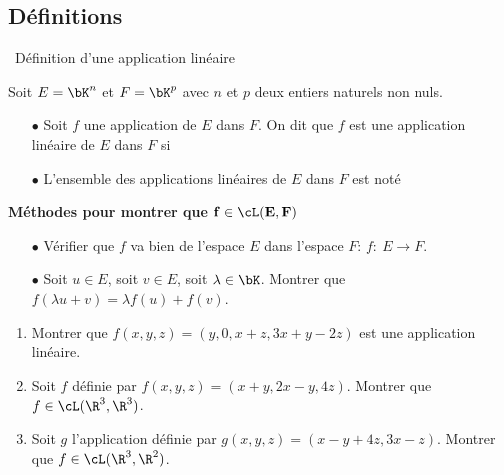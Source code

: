 \documentclass[a4paper, 11pt]{article}
\begin{document}
\subsection{D\'efinitions}

\noindent\ {D\'efinition d'une application lin\'eaire}\\

 {\noindent  

\begin{defi} 
Soit $E=\bK^n$ et $F=\bK^p$ avec $n$ et $p$ deux entiers naturels non nuls. 
\begin{itemize}
\item[$\bullet$] Soit $f$ une application de $E$ dans $F$. On dit que $f$ est une application lin\'eaire de $E$ dans $F$ si\\
\vspace{0.5cm}

\item[$\bullet$] L'ensemble des applications lin\'eaires de $E$ dans $F$ est not\'e \dotfill\vsec
\end{itemize} 
\end{defi}
 
}
\begin{dboxminipage}{0.8 \textwidth}
\textbf{M\'ethodes pour montrer que $\mathbf{f\in\cL(E,F)}$}
\begin{itemize}
\item[$\bullet$] V\'erifier que $f$ va bien de l'espace $E$ dans l'espace $F$: $f:\ E\rightarrow F$.
\item[$\bullet$] Soit $u\in E$, soit $v\in E$, soit $\lambda \in\bK$. Montrer que $f(\lambda u+v)=\lambda f(u)+f(v)$.
\end{itemize}
\end{dboxminipage}



{\footnotesize \begin{exercice} 
\begin{enumerate}
\item Montrer que $f(x,y,z)=(y,0,x+z,3x+y-2z)$ est une application lin\'eaire.
\item Soit $f$ d\'efinie par $f(x,y,z)=(x+y,2x-y,4z)$. Montrer que $f\in\cL(\R^3,\R^3)$.
\item Soit $g$ l'application d\'efinie par $g(x,y,z)=(x-y+4z, 3x-z)$. Montrer que $f\in\cL(\R^3,\R^2)$.
\end{enumerate}
\end{exercice}
}
\end{document}
